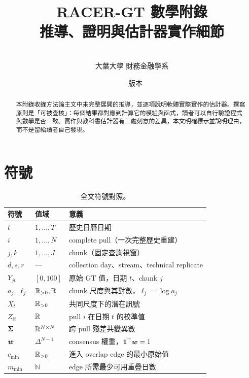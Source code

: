 \documentclass[12pt,a4paper,oneside]{article}
\title{\bfseries RACER-GT 數學附錄\\[0.4em]
\large 推導、證明與估計器實作細節}
\author{\racerauthor\\\small 大葉大學 財務金融學系}
\date{\racerdate\ \textbullet\ 版本 \racerversion}
\begin{document}
\maketitle

\begin{abstract}
\noindent 本附錄收錄方法論主文中未完整展開的推導，並逐項說明軟體實際實作的估計器。撰寫原則是「可被查核」：每個結果都對應到計算它的模組與函式，讀者可以自行驗證程式與數學是否一致。實作與教科書估計器有三處刻意的差異，本文明確標示並說明理由，而不是留給讀者自己發現。
\end{abstract}

\tableofcontents
\newpage

\section{符號}

\begin{table}[H]
\centering
\small
\caption{全文符號對照。}
\begin{tabularx}{\textwidth}{llX}
\toprule
符號 & 值域 & 意義\\
\midrule
$t$ & $1,\dots,T$ & 歷史日曆日期\\
$i$ & $1,\dots,N$ & complete pull（一次完整歷史重建）\\
$j,k$ & $1,\dots,J$ & chunk（固定查詢視窗）\\
$d,s,r$ & --- & collection day、stream、technical replicate\\
$Y_{jt}$ & $[0,100]$ & 原始 GT 值，日期 $t$、chunk $j$\\
$a_j,\ \ell_j$ & $\mathbb{R}_{>0},\mathbb{R}$ & chunk 尺度與其對數，$\ell_j=\log a_j$\\
$X_t$ & $\mathbb{R}_{>0}$ & 共同尺度下的潛在訊號\\
$Z_{it}$ & $\mathbb{R}$ & pull $i$ 在日期 $t$ 的校準值\\
$\bm{\Sigma}$ & $\mathbb{R}^{N\times N}$ & 跨 pull 殘差共變異數\\
$\bm{w}$ & $\Delta^{N-1}$ & consensus 權重，$\bm{1}^\top\bm{w}=1$\\
$c_{\min}$ & $\mathbb{R}_{>0}$ & 進入 overlap edge 的最小原始值\\
$m_{\min}$ & $\mathbb{N}$ & edge 所需最少可用重疊日數\\
\bottomrule
\end{tabularx}
\end{table}

\end{document}
